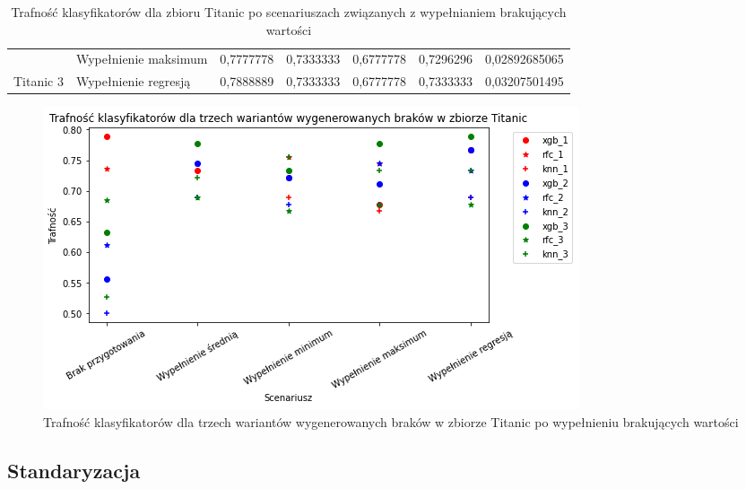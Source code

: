 \documentclass{book}
\begin{document}
\begin{table}[H]
\begin{tabular}{|l|l|r|r|r|r|r|}
                                & Wypełnienie maksimum & 0,7777778                                                                        & 0,7333333                                                                                & 0,6777778                                                                                          & 0,7296296                                                                       & 0,02892685065                                                                    \\ \cline{2-7} 
    \multirow{-5}{*}{Titanic 3} & Wypełnienie regresją & \cellcolor[HTML]{67FD9A}0,7888889                                                & 0,7333333                                                                                & 0,6777778                                                                                          & 0,7333333                                                                       & 0,03207501495                                                                    \\ \hline
    \end{tabular}
    \caption{Trafność klasyfikatorów dla zbioru Titanic po scenariuszach związanych z wypełnianiem brakujących wartości}
    \end{table}

\begin{figure}[H]
    \centerline{\includegraphics[scale=0.8]{Titanic_Wypełnienie_brakujących}}
    \centering
    \caption{Trafność klasyfikatorów dla trzech wariantów wygenerowanych braków w zbiorze Titanic po wypełnieniu brakujących wartości}
    \end{figure}


\subsection{Standaryzacja}
\end{document}
